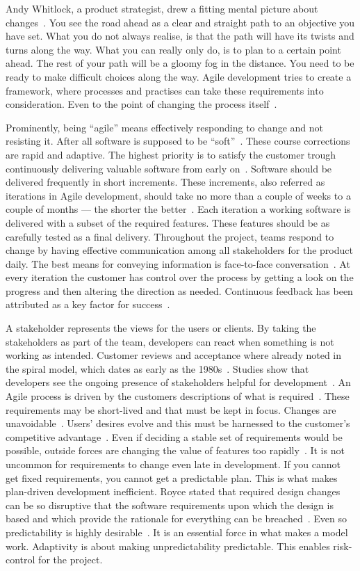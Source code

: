 \documentclass[english]{tktltiki2}
\begin{document}
Andy Whitlock, a product strategist, drew a fitting mental picture about changes~\cite{Whi14}. You see the road ahead as a clear and straight path to an objective you have set. What you do not always realise, is that the path will have its twists and turns along the way. What you can really only do, is to plan to a certain point ahead. The rest of your path will be a gloomy fog in the distance. You need to be ready to make difficult choices along the way. Agile development tries to create a framework, where processes and practises can take these requirements into consideration. Even to the point of changing the process itself~\cite{Fow05}.

Prominently, being “agile” means effectively responding to change and not resisting it. After all software is supposed to be “soft”~\cite{Fow05}. These course corrections are rapid and adaptive. The highest priority is to satisfy the customer trough continuously delivering valuable software from early on~\cite{BBB01b}. Software should be delivered frequently in short increments. These increments, also referred as iterations in Agile development, should take no more than a couple of weeks to a couple of months — the shorter the better~\cite{Fow05}. Each iteration a working software is delivered with a subset of the required features. These features should be as carefully tested as a final delivery. Throughout the project, teams respond to change by having effective communication among all stakeholders for the product daily. The best means for conveying information is face-to-face conversation~\cite{BBB01b}. At every iteration the customer has control over the process by getting a look on the progress and then altering the direction as needed. Continuous feedback has been attributed as a key factor for success~\cite{DD08}.

A stakeholder represents the views for the users or clients. By taking the stakeholders as part of the team, developers can react when something is not working as intended. Customer reviews and acceptance where already noted in the spiral model, which dates as early as the 1980s~\cite{Boe88}. Studies show that developers see the ongoing presence of stakeholders helpful for development~\cite{DD08}. An Agile process is driven by the customers descriptions of what is required~\cite{BBB01b}. These requirements may be short-lived and that must be kept in focus. Changes are unavoidable~\cite{Fow05}. Users’ desires evolve and this must be harnessed to the customer’s competitive advantage~\cite{BBB01b, Fow05}. Even if deciding a stable set of requirements would be possible, outside forces are changing the value of features too rapidly~\cite{Fow05}. It is not uncommon for requirements to change even late in development. If you cannot get fixed requirements, you cannot get a predictable plan. This is what makes plan-driven development inefficient. Royce stated that required design changes can be so disruptive that the software requirements upon which the design is based and which provide the rationale for everything can be breached~\cite{Roy70}. Even so predictability is highly desirable~\cite{Fow05}. It is an essential force in what makes a model work. Adaptivity is about making unpredictability predictable. This enables risk-control for the project.
\end{document}
